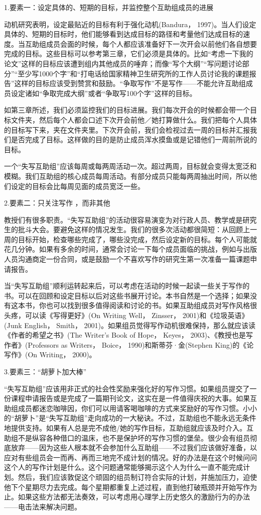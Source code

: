 {\kaishu 1.要素一：设定具体的、短期的目标，并监控整个互助组成员的进展}

动机研究表明，设定最贴近的目标有利于强化动机(Bandura， 1997)。当人们设定具体的、短期的目标时，他们能够看到达成目标的路径和考量他们达成目标的速度。当互助组成员会面的时候，每个人都应该准备好下一次开会以前他们各自想要完成的目标。这些目标可以参考第三章，它们必须是具体的。比如“考虑一下我的论文”这样的目标应该遭到组内其他成员的唾弃；而像“写个大纲”“写问题讨论部分”“至少写1000个字”和“打电话给国家精神卫生研究所的工作人员讨论我的课题报告”这样的目标应该受到赞赏和鼓励。“争取写作”不是写作——不能允许互助组成员设定诸如“争取完成大纲”或者“争取写100个字”这样的目标。

如第三章所述，我们必须监控我们的目标进展。我们每次开会的时候都会带一个目标文件夹，然后每个人都会口述下次开会前他／她打算做什么。我们把每个人具体的目标写下来，夹在文件夹里。下次开会前，我们会检视过去一周的目标并汇报我们是否完成了目标。这样做的目的是防止成员浑水摸鱼或是记错他们一周前所说的目标。

一个“失写互助组”应该每周或每两周活动一次。超过两周，目标就会变得太宽泛和模糊。我们互助组的核心成员每周活动。有部分成员只能每两周抽出时间，所以他们设定的目标会比每周见面的成员宽泛一些。

{\kaishu 2.要素二：只关注写作 ，而非其他}

教授们有很多职责。“失写互助组”的活动很容易演变为对行政人员、教学或是研究生的批斗大会。要避免这样的情况发生。我们的很多次活动都很简短：从回顾上一周的目标开始，检查哪些完成了，哪些没完成，然后设定新的目标。每个人可能就花几分钟。如果有多余的时间，通常会讨论一下每个成员面临的挑战，例如与出版人员沟通商定一份合同，或是鼓励一个不喜欢写作的研究生第一次准备一篇课题申请报告。

当“失写互助组”顺利运转起来后，可以考虑在活动的时候一起读一些关于写作的书。可以在回顾和设定目标以后对这些书展开讨论。本书自然是一个选择；如果没有这本书，你也可以找到很多值得阅读和讨论的书。如果互助组成员对写作风格很头疼，可以读《写得更好》(On Writing Well， Zinsser， 2001)和《垃圾英语》(Junk English， Smith， 2001)。如果组员觉得写作动机很难保持，那么就应该读《作者的希望之书》(The Writer's Book of Hope， Keyes， 2003)、《教授也是写作者》(Professors as Writers， Boice， 1990)和斯蒂芬·金(Stephen King)的《论写作》(On Writing， 2000)。

{\kaishu 3.要素三：“胡萝卜加大棒”}

“失写互助组”应该用非正式的社会性奖励来强化好的写作习惯。如果组员提交了一份课程申请报告或是完成了一篇期刊论文，这实在是一件值得庆祝的大事。如果互助组成员都迷恋咖啡因，你们可以用请客喝咖啡的方式来奖励好的写作习惯。小小的“胡萝卜”是“失写互助组”走向成功的一大秘诀。不过，互助组也不能永远无条件地提供支持。如果有人总是完不成他/她的写作目标，互助组就应该及时介入。互助组不是纵容各种借口的温床，也不是保护坏的写作习惯的堡垒。很少会有组员彻底放弃——因为这些人根本就不会参加什么互助组——不过我们应该做好准备，以应对有些组员会一而再、再而三地完不成计划的情况。好的办法是在这个时候问问这个人的写作计划是什么。这个问题通常能够揭示这个人为什么一直不能完成计划。然后，我们应该敦促这个顽固的组员制订符合实际的计划，并施加压力，迫使他下个星期尽力去完成。每个星期都重复上述过程，直到他打破瓶颈并开始写作为止。如果这些方法都无法奏效，可以考虑用心理学上历史悠久的激励行为的办法——电击法来解决问题。

